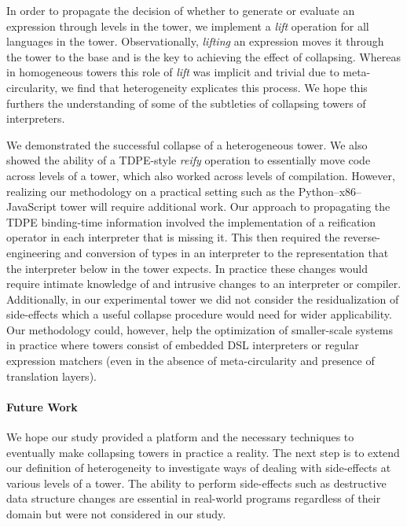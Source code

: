 \documentclass[sigplan,anonymous,review]{acmart}
\theoremstyle{definition}
\begin{document}
In order to propagate the decision of whether to generate or evaluate an expression through levels in the tower, we implement a \textit{lift} operation for all languages in the tower. Observationally, \textit{lifting} an expression moves it through the tower to the base and is the key to achieving the effect of collapsing. Whereas in homogeneous towers this role of \textit{lift} was implicit and trivial due to meta-circularity, we find that heterogeneity explicates this process. We hope this furthers the understanding of some of the subtleties of collapsing towers of interpreters.

We demonstrated the successful collapse of a heterogeneous tower. We also showed the ability of a TDPE-style \textit{reify} operation to essentially move code across levels of a tower, which also worked across levels of compilation. However, realizing our methodology on a practical setting such as the Python--x86--JavaScript tower will require additional work. Our approach to propagating the TDPE binding-time information involved the implementation of a reification operator in each interpreter that is missing it. This then required the reverse-engineering and conversion of types in an interpreter to the representation that the interpreter below in the tower expects. In practice these changes would require intimate knowledge of and intrusive changes to an interpreter or compiler. Additionally, in our experimental tower we did not consider the residualization of side-effects which a useful collapse procedure would need for wider applicability. Our methodology could, however, help the optimization of smaller-scale systems in practice where towers consist of embedded DSL interpreters or regular expression matchers (even in the absence of meta-circularity and presence of translation layers).

\paragraph{Future Work}

We hope our study provided a platform and the necessary techniques to eventually make collapsing towers in practice a reality. The next step is to extend our definition of heterogeneity to investigate ways of dealing with side-effects at various levels of a tower. The ability to perform side-effects such as destructive data structure changes are essential in real-world programs regardless of their domain but were not considered in our study.
\end{document}
